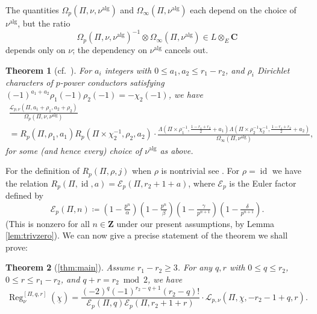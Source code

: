 \documentclass[cjm]{ipart}
\theoremstyle{plain}
\newtheorem{theorem}{Theorem}[subsection]
\theoremstyle{remark}
\DeclareMathOperator{\alg}{alg}
\DeclareMathOperator{\id}{id}
\newcommand{\CC}{\mathbf{C}}
\newcommand{\ZZ}{\mathbf{Z}}
\newcommand{\cE}{\mathcal{E}}
\newcommand{\cL}{\mathcal{L}}
\newcommand{\uchi}{\underline{\chi}}
\numberwithin{equation}{subsection}
\renewcommand{\le}{\leqslant}
\renewcommand{\ge}{\geqslant}
\begin{document}
  \begin{remark}
   The quantities $\Omega_p(\Pi, \nu, \nu^{\alg})$ and $\Omega_\infty(\Pi, \nu^{\alg})$ each depend on the choice of $\nu^{\mathrm{alg}}$, but the ratio
   \[ \Omega_p(\Pi, \nu, \nu^{\alg})^{-1} \otimes \Omega_\infty(\Pi, \nu^{\alg}) \in L \otimes_{E} \CC\] depends only on $\nu$; the dependency on $\nu^{\alg}$ cancels out.
  \end{remark}

  \begin{theorem}[{cf.~\cite[Theorem 6.2.5]{LZ-equivar}}]
   \label{thm:padicLfcn}
   For $a_i$ integers with $0 \le a_1, a_2 \le r_1 - r_2$, and $\rho_i$ Dirichlet characters of $p$-power conductors satisfying $(-1)^{a_1 + a_2} \rho_1(-1) \rho_2(-1) = -\chi_2(-1)$, we have
   \begin{multline*}
    \frac{\cL_{p, \nu}(\Pi, a_1 + \rho_1, a_2 + \rho_2)}{\Omega_p(\Pi, \nu, \nu^{\alg})} \\
    = R_p(\Pi, \rho_1, a_1) R_p(\Pi \times \chi_2^{-1}, \rho_2, a_2) \cdot
    \frac{\Lambda(\Pi \times \rho_1^{-1}, \tfrac{1-r_1+r_2}{2} + a_1)\Lambda(\Pi \times \rho_2^{-1}\chi_2^{-1}, \tfrac{1-r_1+r_2}{2} + a_2)}{\Omega_{\infty}(\Pi, \nu^{\alg})},
   \end{multline*}
   for some (and hence every) choice of $\nu^{\alg}$ as above.
  \end{theorem}

  For the definition of $R_p(\Pi, \rho, j)$ when $\rho$ is nontrivial see \cite{LPSZ1}. For $\rho = \id$ we have the relation
  $R_p(\Pi, \id, a) = \cE_p(\Pi, r_2 + 1 + a)$, where $\cE_p$ is the Euler factor defined by
  \[ \cE_p(\Pi, n) \coloneqq \left(1- \tfrac{p^n}{\alpha}\right) \left(1- \tfrac{p^n}{\beta}\right) \left(1- \tfrac{\gamma}{p^{n+1}}\right) \left(1- \tfrac{\delta}{p^{n+1}}\right).\]
  (This is nonzero for all $n \in \ZZ$ under our present assumptions, by Lemma \ref{lem:trivzero}). We can now give a precise statement of the theorem we shall prove:
  \bigskip

  \begin{mdframed}
   \begin{theorem}[{\cref{thm:main}}]
    \label{thm:mainthm}
    Assume $r_1 - r_2 \ge 3$. For any $q, r$ with $0 \le q \le r_2$, $0 \le r \le r_1 - r_2$, and $q+r = r_2 \bmod 2$, we have
    \[
     \operatorname{Reg}^{[\Pi, q, r]}_{\nu}(\uchi) = \frac{(-2)^q (-1)^{r_2 - q+1} (r_2 - q)!}{\cE_p(\Pi, q) \cE_p(\Pi, r_2 + 1 + r)} \cdot \cL_{p, \nu}(\Pi,\uchi, -r_2-1 + q, r).
    \]
   \end{theorem}
  \end{mdframed}
\end{document}

